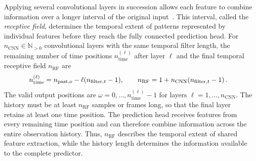 Applying several convolutional layers in succession allows each feature to combine information over a longer interval of the original input~\cite{Goodfellow2016}.
This interval, called the \emph{receptive field}, determines the temporal extent of patterns represented by individual features before they reach the fully connected prediction head.
For $n_{\mathrm{CNN}}\in\mathbb N_{>0}$ convolutional layers with the same temporal filter length, the remaining number of time positions $n_{\mathrm{time}}^{(\ell)}$ after layer $\ell$ and the final temporal receptive field $n_{\mathrm{RF}}$ are
\begin{equation}
    n_{\mathrm{time}}^{(\ell)}=n_{\mathrm{past},o}-\ell(n_{\mathrm{filter},t}-1),
    \qquad
    n_{\mathrm{RF}}=1+n_{\mathrm{CNN}}(n_{\mathrm{filter},t}-1)\,.
    \label{eq:cnn_temporal_geometry}
\end{equation}
The valid output positions are $\omega=0,\ldots,n_{\mathrm{time}}^{(\ell)}-1$ for layers $\ell=1,\ldots,n_{\mathrm{CNN}}$.
The history must be at least $n_{\mathrm{RF}}$ samples or frames long, so that the final layer retains at least one time position.
The prediction head receives features from every remaining time position and can therefore combine information across the entire observation history.
Thus, $n_{\mathrm{RF}}$ describes the temporal extent of shared feature extraction, while the history length determines the information available to the complete predictor.

